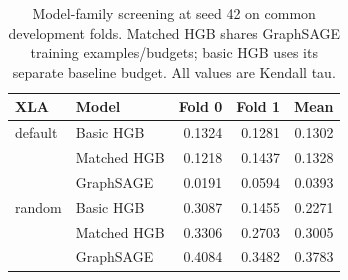 \begin{table}[t]
\centering
\begin{tabular}{@{}llrrr@{}}
\toprule
XLA & Model & Fold 0 & Fold 1 & Mean \\
\midrule
default & Basic HGB & 0.1324 & 0.1281 & 0.1302 \\
 & Matched HGB & 0.1218 & 0.1437 & 0.1328 \\
 & GraphSAGE & 0.0191 & 0.0594 & 0.0393 \\
random & Basic HGB & 0.3087 & 0.1455 & 0.2271 \\
 & Matched HGB & 0.3306 & 0.2703 & 0.3005 \\
 & GraphSAGE & 0.4084 & 0.3482 & 0.3783 \\
\bottomrule
\end{tabular}
\caption{Model-family screening at seed 42 on common development folds. Matched HGB shares GraphSAGE training examples/budgets; basic HGB uses its separate baseline budget. All values are Kendall tau.}
\label{tab:family}
\end{table}
